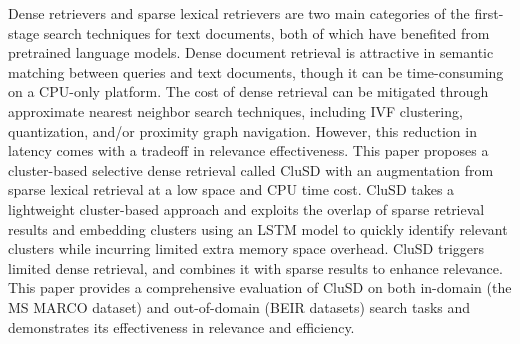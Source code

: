 


Dense retrievers and sparse lexical retrievers are two main categories of the
first-stage search techniques for text  documents, both of which have benefited from pretrained language models.
Dense document retrieval is attractive  in semantic  matching between queries and
text  documents, though it can be time-consuming on a CPU-only platform.
The cost of dense retrieval can be mitigated through approximate nearest neighbor search techniques, including IVF clustering, quantization, and/or 
proximity graph navigation. However, this reduction in latency comes with a tradeoff  in relevance effectiveness. 
This paper proposes a cluster-based selective dense retrieval called CluSD with an augmentation from sparse lexical retrieval 
at a low space and CPU time cost. 
CluSD takes a lightweight cluster-based approach and exploits the overlap of sparse retrieval results and embedding clusters
using an LSTM model to quickly identify relevant clusters  while incurring limited  extra memory space overhead. 
CluSD  triggers limited dense retrieval, and combines it with  sparse results to enhance relevance. 
This paper provides a comprehensive evaluation of CluSD on both in-domain (the MS MARCO dataset) and out-of-domain (BEIR  datasets) search tasks
and demonstrates its effectiveness in relevance and efficiency.


